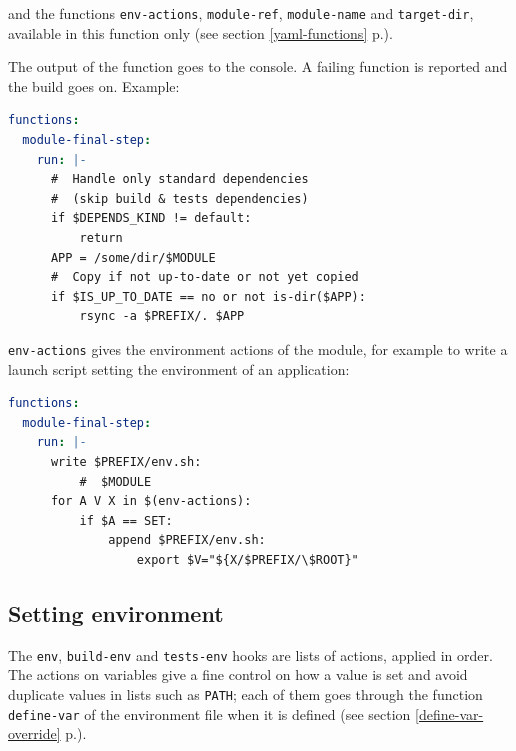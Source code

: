 \documentclass[a4paper,12pt,twoside]{article}
\newcommand{\code}[1]{\texttt{#1}}
\newcommand{\seeref}[1]{see section \ref{#1} p.\pageref{#1}}
\begin{document}
and the functions \code{env-actions}, \code{module-ref},
\code{module-name} and \code{target-dir}, available in this function only
(\seeref{yaml-functions}).

The output of the function goes to the console. A failing function is
reported and the build goes on. Example:

\begin{lstlisting}[language={yaml}]
functions:
  module-final-step:
    run: |-
      #  Handle only standard dependencies
      #  (skip build & tests dependencies)
      if $DEPENDS_KIND != default:
          return
      APP = /some/dir/$MODULE
      #  Copy if not up-to-date or not yet copied
      if $IS_UP_TO_DATE == no or not is-dir($APP):
          rsync -a $PREFIX/. $APP
\end{lstlisting}

\code{env-actions} gives the environment actions of the module, for
example to write a launch script setting the environment of an
application:

\begin{lstlisting}[language={yaml}]
functions:
  module-final-step:
    run: |-
      write $PREFIX/env.sh:
          #  $MODULE
      for A V X in $(env-actions):
          if $A == SET:
              append $PREFIX/env.sh:
                  export $V="${X/$PREFIX/\$ROOT}"
\end{lstlisting}

\subsection{Setting environment}
\label{set-env}

The \code{env}, \code{build-env} and \code{tests-env} hooks are lists of
actions, applied in order. The actions on variables give a fine control on
how a value is set and avoid duplicate values in lists such as \code{PATH};
each of them goes through the function \code{define-var} of the
environment file when it is defined (\seeref{define-var-override}).
\end{document}
